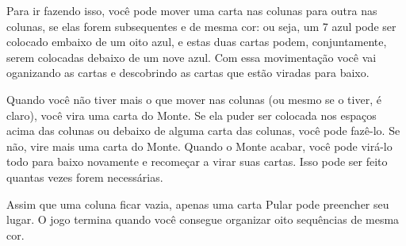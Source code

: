 Para ir fazendo isso, você pode mover uma carta nas colunas para outra nas colunas, se elas forem subsequentes e de mesma cor: ou seja, um 7 azul pode ser colocado embaixo de um oito azul, e estas duas cartas podem, conjuntamente, serem colocadas debaixo de um nove azul. Com essa movimentação você vai oganizando as cartas e descobrindo as cartas que estão viradas para baixo.

Quando você não tiver mais o que mover nas colunas (ou mesmo se o tiver, é claro), você vira uma carta do Monte. Se ela puder ser colocada nos espaços acima das colunas ou debaixo de alguma carta das colunas, você pode fazê-lo. Se não, vire mais uma carta do Monte. Quando o Monte acabar, você pode virá-lo todo para baixo novamente e recomeçar a virar suas cartas. Isso pode ser feito quantas vezes forem necessárias.

Assim que uma coluna ficar vazia, apenas uma carta Pular pode preencher seu lugar. O jogo termina quando você consegue organizar oito sequências de mesma cor.